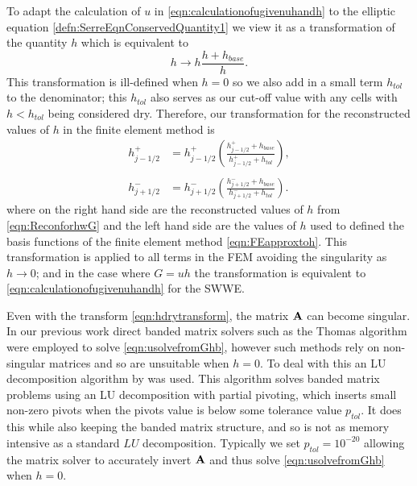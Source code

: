 To adapt the calculation of $u$ in \eqref{eqn:calculationofugivenuhandh} to the elliptic equation \eqref{defn:SerreEqnConservedQuantity1} we view it as a transformation of the quantity $h$ which is equivalent to
\begin{equation}
h \rightarrow h \frac{h + h_{base}}{h}.
\end{equation}
This transformation is ill-defined when $h = 0$ so we also add in a  small term $h_{tol}$ to the denominator; this $h_{tol}$ also serves as our cut-off value with any cells with $h < h_{tol}$ being considered dry. Therefore, our transformation for the reconstructed values of $h$ in the finite element method is
\begin{subequations}
	\begin{align}
	h^+_{j-1/2} & = h^+_{j-1/2} \left(\frac{ h^+_{j-1/2}  + h_{base}}{h^+_{j-1/2} + h_{tol}}\right) , \\ \nonumber\\
	h^-_{j+1/2} & = h^-_{j+1/2} \left(\frac{ h^-_{j+1/2}  + h_{base}}{h^-_{j+1/2} + h_{tol}}\right).
	\end{align} 
	\label{eqn:hdrytransform}
\end{subequations}
where on the right hand side are the reconstructed values of $h$ from \eqref{eqn:ReconforhwG} and the left hand side are the values of $h$ used to defined the basis functions of the finite element method \eqref{eqn:FEapproxtoh}. This transformation is applied to all terms in the FEM avoiding the singularity as $h \rightarrow 0$; and in the case where $G = uh$ the transformation is equivalent to \eqref{eqn:calculationofugivenuhandh} for the SWWE.

Even with the transform \eqref{eqn:hdrytransform}, the matrix $\mathbf{A}$ can become singular.
In our previous work \cite{Zoppou-etal-2017} direct banded matrix solvers such as the Thomas algorithm \cite{Conte-DeBoor-1980} were employed to solve \eqref{eqn:usolvefromGhb}, however such methods rely on non-singular matrices and so are unsuitable when $h = 0$. To deal with this an LU decomposition algorithm by \citet{NumRecC-1996} was used. This algorithm solves banded matrix problems using an LU decomposition with partial pivoting, which inserts small non-zero pivots when the pivots value is below some tolerance value $p_{tol}$. It does this while also keeping the banded matrix structure, and so is not as memory intensive as a standard $LU$ decomposition. Typically we set $p_{tol} = 10^{-20}$ allowing the matrix solver to accurately invert $\mathbf{A}$ and thus solve \eqref{eqn:usolvefromGhb} when $h = 0$. 

